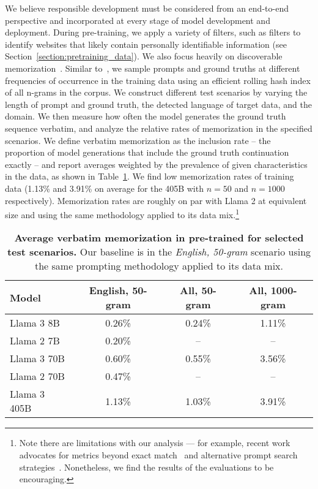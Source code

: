 We believe responsible development must be considered from an end-to-end perspective and incorporated at every stage of model development and deployment. During pre-training, we apply a variety of filters, such as filters to identify websites that likely contain personally identifiable information (see Section~\ref{section:pretraining_data}). We also focus heavily on discoverable memorization~\citep{nasr2023scalableextraction}.
Similar to~\citet{carlini2022quantifying}, we sample prompts and ground truths at different frequencies of occurrence in the training data using an efficient rolling hash index of all n-grams in the corpus.
We construct different test scenarios by varying the length of prompt and ground truth, the detected language of target data, and the domain.
We then measure how often the model generates the ground truth sequence verbatim, and analyze the relative rates of memorization in the specified scenarios.
We define verbatim memorization as the inclusion rate -- the proportion of model generations that include the ground truth continuation exactly -- and report averages weighted by the prevalence of given characteristics in the data, as shown in Table~\ref{table:memorization_results}. We find low memorization rates of training data (1.13\% and 3.91\% on average for the 405B with $n=50$ and $n=1000$ respectively). Memorization rates are roughly on par with Llama 2 at equivalent size and using the same methodology applied to its data mix.\footnote{Note there are limitations with our analysis --- for example, recent work advocates for metrics beyond exact match~\citep{ippolito-etal-2023-preventing} and alternative prompt search strategies~\citep{kassem2024alpacavicunausingllms}. Nonetheless, we find the results of the evaluations to be encouraging.}

\begin{table}
    \centering
    \begin{tabular}{lccc}
        \toprule
        \textbf{Model} & \textbf{English, 50-gram} & \textbf{All, 50-gram} & \textbf{All, 1000-gram} \\
        \midrule
        Llama 3 8B & 0.26\% & 0.24\% & 1.11\% \\
        Llama 2 7B & 0.20\% & --  & -- \\
        \midrule
        Llama 3 70B & 0.60\% & 0.55\% & 3.56\% \\
        Llama 2 70B & 0.47\% & -- & -- \\
        \midrule
        Llama 3 405B & 1.13\% & 1.03\% & 3.91\% \\
        \bottomrule
    \end{tabular}
    \caption{\textbf{Average verbatim memorization in pre-trained \llamathree for selected test scenarios.} Our baseline is \llamatwo in the \textit{English, 50-gram} scenario using the same prompting methodology applied to its data mix.}
    \label{table:memorization_results}
\end{table}

